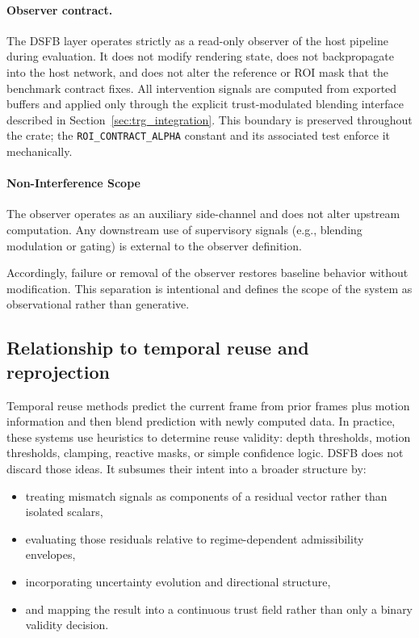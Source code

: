 \documentclass[11pt,letterpaper]{article}
\theoremstyle{gcresult}
\theoremstyle{definition}
\begin{document}




\paragraph{Observer contract.}
The DSFB layer operates strictly as a read-only observer of the host pipeline during evaluation. It does not modify rendering state, does not backpropagate into the host network, and does not alter the reference or ROI mask that the benchmark contract fixes. All intervention signals are computed from exported buffers and applied only through the explicit trust-modulated blending interface described in Section~\ref{sec:trg_integration}. This boundary is preserved throughout the crate; the \texttt{ROI\_CONTRACT\_ALPHA} constant and its associated test enforce it mechanically.


\paragraph{Non-Interference Scope}

The observer operates as an auxiliary side-channel and does not alter upstream computation. Any downstream use of supervisory signals (e.g., blending modulation or gating) is external to the observer definition.

Accordingly, failure or removal of the observer restores baseline behavior without modification. This separation is intentional and defines the scope of the system as observational rather than generative.


\subsection{Relationship to temporal reuse and reprojection}

Temporal reuse methods predict the current frame from prior frames plus motion information and then blend prediction with newly computed data. In practice, these systems use heuristics to determine reuse validity: depth thresholds, motion thresholds, clamping, reactive masks, or simple confidence logic. DSFB does not discard those ideas. It subsumes their intent into a broader structure by:
\begin{itemize}[leftmargin=1.5em]
    \item treating mismatch signals as components of a residual vector rather than isolated scalars,
    \item evaluating those residuals relative to regime-dependent admissibility envelopes,
    \item incorporating uncertainty evolution and directional structure,
    \item and mapping the result into a continuous trust field rather than only a binary validity decision.
\end{itemize}
\end{document}
